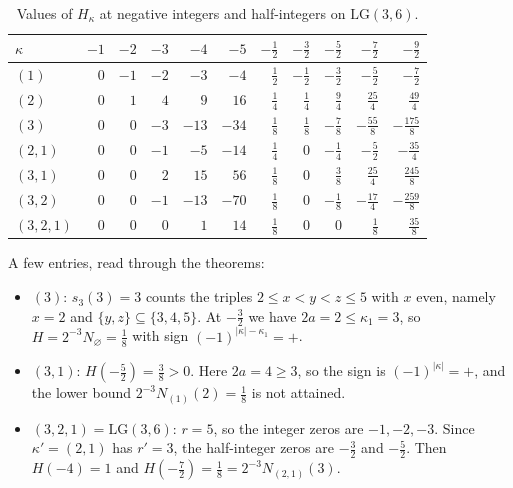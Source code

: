 \documentclass[11pt]{amsart}
\theoremstyle{definition}
\theoremstyle{remark}
\newcommand{\LG}{\mathrm{LG}}
\begin{document}
\begin{table}[ht]
\centering
\small
\renewcommand{\arraystretch}{1.2}
\setlength{\tabcolsep}{4pt}
\begin{tabular}{@{}l|rrrrr|rrrrr@{}}
\toprule
$\kappa$ & $-1$ & $-2$ & $-3$ & $-4$ & $-5$ & $-\frac12$ & $-\frac32$ & $-\frac52$ & $-\frac72$ & $-\frac92$\\
\midrule
$(1)$ & $0$ & $-1$ & $-2$ & $-3$ & $-4$ & $\frac12$ & $-\frac12$ & $-\frac32$ & $-\frac52$ & $-\frac72$\\
$(2)$ & $0$ & $1$ & $4$ & $9$ & $16$ & $\frac14$ & $\frac14$ & $\frac94$ & $\frac{25}4$ & $\frac{49}4$\\
$(3)$ & $0$ & $0$ & $-3$ & $-13$ & $-34$ & $\frac18$ & $\frac18$ & $-\frac78$ & $-\frac{55}8$ & $-\frac{175}8$\\
$(2,1)$ & $0$ & $0$ & $-1$ & $-5$ & $-14$ & $\frac14$ & $0$ & $-\frac14$ & $-\frac52$ & $-\frac{35}4$\\
$(3,1)$ & $0$ & $0$ & $2$ & $15$ & $56$ & $\frac18$ & $0$ & $\frac38$ & $\frac{25}4$ & $\frac{245}8$\\
$(3,2)$ & $0$ & $0$ & $-1$ & $-13$ & $-70$ & $\frac18$ & $0$ & $-\frac18$ & $-\frac{17}4$ & $-\frac{259}8$\\
$(3,2,1)$ & $0$ & $0$ & $0$ & $1$ & $14$ & $\frac18$ & $0$ & $0$ & $\frac18$ & $\frac{35}8$\\
\bottomrule
\end{tabular}
\caption{Values of $H_\kappa$ at negative integers and half-integers on $\LG(3,6)$.}\label{tab:lg3vals}
\end{table}

A few entries, read through the theorems:
\begin{itemize}
\item $(3)$: $s_3(3)=3$ counts the triples $2\le x<y<z\le5$ with $x$ even, namely $x=2$ and
$\{y,z\}\subseteq\{3,4,5\}$. At $-\tfrac32$ we have $2a=2\le\kappa_1=3$, so
$H=2^{-3}N_\varnothing=\tfrac18$ with sign $(-1)^{|\kappa|-\kappa_1}=+$.
\item $(3,1)$: $H(-\tfrac52)=\tfrac38>0$. Here $2a=4\ge3$, so the sign is
$(-1)^{|\kappa|}=+$, and the lower bound $2^{-3}N_{(1)}(2)=\tfrac18$ is not attained.
\item $(3,2,1)=\LG(3,6)$: $r=5$, so the integer zeros are $-1,-2,-3$. Since $\kappa'=(2,1)$ has
$r'=3$, the half-integer zeros are $-\tfrac32$ and $-\tfrac52$. Then $H(-4)=1$ and
$H(-\tfrac72)=\tfrac18=2^{-3}N_{(2,1)}(3)$.
\end{itemize}
\end{document}
